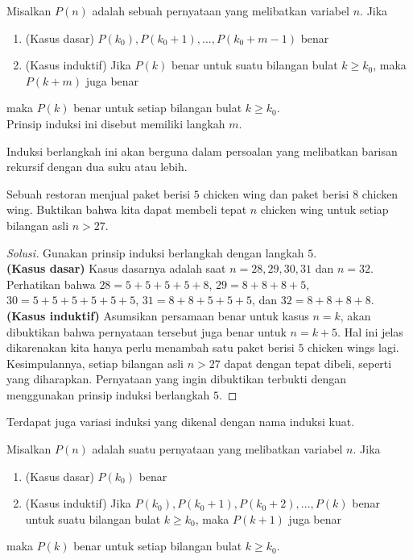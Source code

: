 \documentclass[11pt]{scrartcl}
\begin{document}
\begin{theorem}
    Misalkan $P(n)$ adalah sebuah pernyataan yang melibatkan variabel $n$. Jika
    \begin{enumerate}
        \item (Kasus dasar) $P(k_0), P(k_0 + 1), ..., P(k_0 + m - 1)$ benar
        \item (Kasus induktif) Jika $P(k)$ benar untuk suatu bilangan bulat $k \geq k_0$, maka $P(k+m)$ juga benar 
    \end{enumerate}
    maka $P(k)$ benar untuk setiap bilangan bulat $k \geq k_0$.\\
    Prinsip induksi ini disebut memiliki langkah $m$.
\end{theorem}

Induksi berlangkah ini akan berguna dalam persoalan yang melibatkan barisan rekursif dengan dua suku atau lebih.

\begin{example}
    Sebuah restoran menjual paket berisi $5$ chicken wing dan paket berisi $8$ chicken wing. Buktikan bahwa kita dapat membeli tepat $n$ chicken wing untuk setiap bilangan asli $n > 27$.
\end{example}

\begin{proof}[Solusi]
Gunakan prinsip induksi berlangkah dengan langkah $5$.\\
\textbf{(Kasus dasar)} Kasus dasarnya adalah saat $n = 28, 29, 30, 31$ dan $n = 32$. Perhatikan bahwa $28 = 5 + 5 + 5 + 5 + 8$, $29 = 8 + 8 + 8 + 5$, $30 = 5 + 5 + 5 + 5 + 5 + 5$, $31 = 8 + 8 + 5 + 5 + 5$, dan $32 = 8 + 8 + 8 + 8$.\\
\textbf{(Kasus induktif)} Asumsikan persamaan benar untuk kasus $n = k$, akan dibuktikan bahwa pernyataan tersebut juga benar untuk $n = k + 5$. Hal ini jelas dikarenakan kita hanya perlu menambah satu paket berisi $5$ chicken wings lagi.
Kesimpulannya, setiap bilangan asli $n > 27$ dapat dengan tepat dibeli, seperti yang diharapkan. Pernyataan yang ingin dibuktikan terbukti dengan menggunakan prinsip induksi berlangkah $5$.
\end{proof}

Terdapat juga variasi induksi yang dikenal dengan nama induksi kuat.

\begin{theorem}
    Misalkan $P(n)$ adalah suatu pernyataan yang melibatkan variabel $n$. Jika
    \begin{enumerate}
        \item (Kasus dasar) $P(k_0)$ benar
        \item (Kasus induktif) Jika $P(k_0), P(k_0 + 1), P(k_0 + 2), ..., P(k)$ benar untuk suatu bilangan bulat $k \geq k_0$, maka $P(k + 1)$ juga benar
    \end{enumerate}
    maka $P(k)$ benar untuk setiap bilangan bulat $k \geq k_0$. 
\end{theorem}
\end{document}
